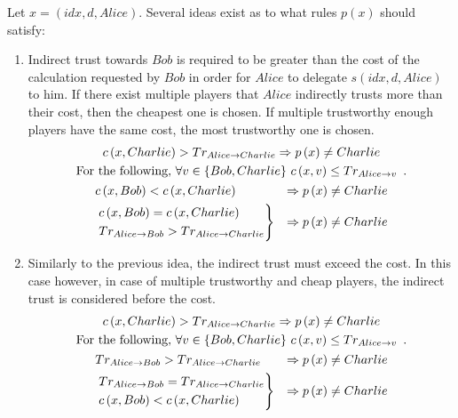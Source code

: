   Let $x = \left(idx, d, Alice\right)$. Several ideas exist as to what rules $p\left(x\right)$ should satisfy:
  \begin{enumerate}
    \item Indirect trust towards $Bob$ is required to be greater than the cost of the calculation requested by $Bob$ in order
    for $Alice$ to delegate $s\left(idx, d, Alice\right)$ to him. If there exist multiple players that $Alice$ indirectly
    trusts more than their cost, then the cheapest one is chosen. If multiple trustworthy enough players have the same cost,
    the most trustworthy one is chosen.
    \begin{gather*}
        c\left(x, Charlie\right) > Tr_{Alice \rightarrow Charlie} \Rightarrow p\left(x\right) \neq Charlie \\
	\mbox{For the following, } \forall v \in \{Bob, Charlie\} \ c\left(x, v\right) \leq Tr_{Alice \rightarrow v} \enspace.
	\\
      \begin{aligned}
        & c\left(x, Bob\right) < c\left(x, Charlie\right) & \Rightarrow p\left(x\right) \neq Charlie  \\
        &
        \begin{rcases}
          c\left(x, Bob\right) = c\left(x, Charlie\right) \\
  	Tr_{Alice \rightarrow Bob} > Tr_{Alice \rightarrow Charlie}
        \end{rcases}
        & \Rightarrow p\left(x\right) \neq Charlie
      \end{aligned}
    \end{gather*}
    \item Similarly to the previous idea, the indirect trust must exceed the cost. In this case however, in case of multiple
    trustworthy and cheap players, the indirect trust is considered before the cost.
    \begin{gather*}
        c\left(x, Charlie\right) > Tr_{Alice \rightarrow Charlie} \Rightarrow p\left(x\right) \neq Charlie \\
	\mbox{For the following, } \forall v \in \{Bob, Charlie\} \ c\left(x, v\right) \leq Tr_{Alice \rightarrow v} \enspace.
	\\
      \begin{aligned}
        & Tr_{Alice \rightarrow Bob} > Tr_{Alice \rightarrow Charlie} & \Rightarrow p\left(x\right) \neq Charlie \\
        &
        \begin{rcases}
          Tr_{Alice \rightarrow Bob} = Tr_{Alice \rightarrow Charlie} \\
  	  c\left(x, Bob\right) < c\left(x, Charlie\right)
        \end{rcases}
        & \Rightarrow p\left(x\right) \neq Charlie
      \end{aligned}
    \end{gather*}
  \end{enumerate}
